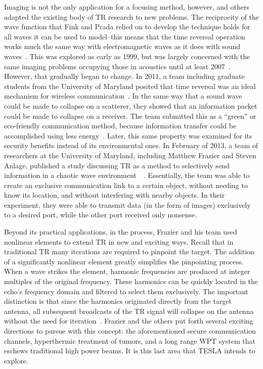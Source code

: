 Imaging is not the only application for a focusing method, however, and others adapted the existing body of TR research to new problems. The reciprocity of the wave function that Fink and Prada relied on to develop the technique holds for all waves it can be used to model--this means that the time reversal operation works much the same way with electromagnetic waves as it does with sound waves~\cite{chambers_target_2007}. This was explored as early as 1999, but was largely concerned with the same imaging problems occupying those in acoustics until at least 2007~\cite{chambers_target_2007}. However, that gradually began to change. In 2011, a team including graduate students from the University of Maryland posited that time reversal was an ideal mechanism for wireless communication~\cite{wang_green_2011}. In the same way that a sound wave could be made to collapse on a scatterer, they showed that an information packet could be made to collapse on a receiver. The team submitted this as a ``green'' or eco-friendly communication method, because information transfer could be accomplished using less energy~\cite{wang_green_2011}. Later, this same property was examined for its security benefits instead of its environmental ones. In February of 2013, a team of researchers at the University of Maryland, including Matthew Frazier and Steven Anlage, published a study discussing TR as a method to selectively send information in a chaotic wave environment~\cite{nltr-wave-chaotic}~\cite{taddese_sensing_2010}. Essentially, the team was able to create an exclusive communication link to a certain object, without needing to know its location, and without interfering with nearby objects. In their experiment, they were able to transmit data (in the form of images) exclusively to a desired port, while the other port received only nonsense.

Beyond its practical applications, in the process, Frazier and his team used nonlinear elements to extend TR in new and exciting ways. Recall that in traditional TR many iterations are required to pinpoint the target. The addition of a significantly nonlinear element greatly simplifies the pinpointing process. When a wave strikes the element, harmonic frequencies are produced at integer multiples of the original frequency. These harmonics can be quickly located in the echo’s frequency domain and filtered to select them exclusively. The important distinction is that since the harmonics originated directly from the target antenna, all subsequent broadcasts of the TR signal will collapse on the antenna without the need for iteration~\cite{nltr-wave-chaotic}. Frazier and the others put forth several exciting directions to pursue with this concept: the aforementioned secure communication channels, hyperthermic treatment of tumors, and a long range WPT system that eschews traditional high power beams. It is this last area that TESLA intends to explore.